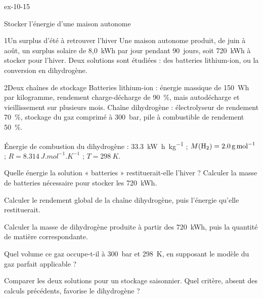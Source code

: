 \begin{blocLivre}{ex-10-15}
\begin{exercice}[3]{Stocker l'énergie d'une maison autonome}
\begin{docu}{1}{Un surplus d'été à retrouver l'hiver}
Une maison autonome produit, de juin à août, un surplus solaire de 8,0~kWh par jour pendant 90~jours, soit 720~kWh à
stocker pour l'hiver. Deux solutions sont étudiées : des batteries lithium-ion, ou la conversion en dihydrogène.
\end{docu}
\begin{docu}{2}{Deux chaînes de stockage}
Batteries lithium-ion : énergie massique de 150~Wh par kilogramme, rendement charge-décharge de 90~\%, mais
autodécharge et vieillissement sur plusieurs mois. Chaîne dihydrogène : électrolyseur de rendement 70~\%, stockage du
gaz comprimé à 300~bar, pile à combustible de rendement 50~\%.
\end{docu}
\begin{donnees}
Énergie de combustion du dihydrogène : \qty{33,3}{kW.h.kg^{-1}} ; $M(\ce{H2})=\qty{2,0}{g.mol^{-1}}$ ;
$R=\qty{8,314}{J.mol^{-1}.K^{-1}}$ ; $T=\qty{298}{K}$.
\end{donnees}
\begin{questions}
\item Quelle énergie la solution « batteries » restituerait-elle l'hiver ? Calculer la masse de batteries nécessaire
pour stocker les 720~kWh.
\item Calculer le rendement global de la chaîne dihydrogène, puis l'énergie qu'elle restituerait.
\item Calculer la masse de dihydrogène produite à partir des 720~kWh, puis la quantité de matière correspondante.
\item Quel volume ce gaz occupe-t-il à 300~bar et 298~K, en supposant le modèle du gaz parfait applicable ?
\item \initiative Comparer les deux solutions pour un stockage saisonnier. Quel critère, absent des calculs
précédents, favorise le dihydrogène ?
\end{questions}
\end{exercice}
\end{blocLivre}
